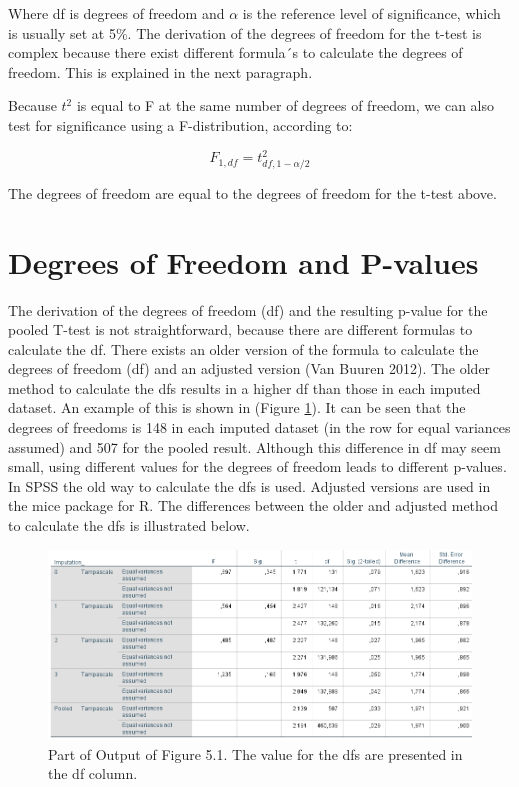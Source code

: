 \documentclass[]{book}
\theoremstyle{definition}
\theoremstyle{definition}
\theoremstyle{definition}
\theoremstyle{remark}
\begin{document}
Where df is degrees of freedom and \(\alpha\) is the reference level of
significance, which is usually set at 5\%. The derivation of the degrees
of freedom for the t-test is complex because there exist different
formula´s to calculate the degrees of freedom. This is explained in the
next paragraph.

Because \(t^2\) is equal to F at the same number of degrees of freedom,
we can also test for significance using a F-distribution, according to:

\begin{equation}
F_{1, df}=t^2_{df,1-\alpha/2}
  \label{eq:f-distr}
\end{equation}

The degrees of freedom are equal to the degrees of freedom for the
t-test above.

\section{Degrees of Freedom and
P-values}\label{degrees-of-freedom-and-p-values}

The derivation of the degrees of freedom (df) and the resulting p-value
for the pooled T-test is not straightforward, because there are
different formulas to calculate the df. There exists an older version of
the formula to calculate the degrees of freedom (df) and an adjusted
version (Van Buuren 2012). The older method to calculate the dfs results
in a higher df than those in each imputed dataset. An example of this is
shown in (Figure \ref{fig:tab5-2}). It can be seen that the degrees of
freedoms is 148 in each imputed dataset (in the row for equal variances
assumed) and 507 for the pooled result. Although this difference in df
may seem small, using different values for the degrees of freedom leads
to different p-values. In SPSS the old way to calculate the dfs is used.
Adjusted versions are used in the mice package for R. The differences
between the older and adjusted method to calculate the dfs is
illustrated below.

\begin{figure}

{\centering \includegraphics[width=0.9\linewidth]{images/table5.2} 

}

\caption{Part of Output of Figure 5.1. The value for the dfs are presented in the df column.}\label{fig:tab5-2}
\end{figure}
\end{document}
